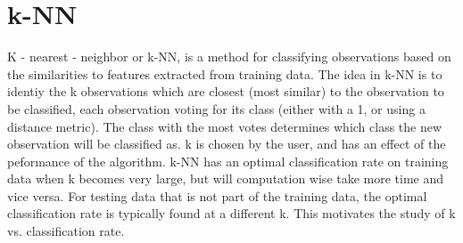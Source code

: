 \chapter{k-NN}
K - nearest - neighbor or k-NN,
is a method for classifying observations based on the similarities
to features extracted from training data.
The idea in k-NN is to identiy the k observations which are closest (most similar) to the
observation to be classified, each observation voting for its class
(either with a 1, or using a distance metric).
 The class with the most votes determines which class the new observation
will be classified as. 
k is chosen by the user,
 and has an effect of the peformance of the algorithm. 
k-NN has an optimal classification rate on training data when k becomes very large, 
but will computation wise take more time and vice versa.
For testing data that is not part of the training data,
the optimal classification rate is typically found at a different k.
This motivates the study of k vs. classification rate.